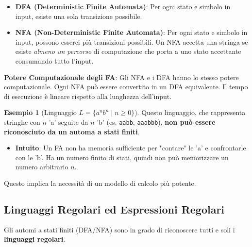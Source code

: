 \documentclass[a4paper]{article}
\theoremstyle{definition} %
\newtheorem{example}{Esempio}
\begin{document}
\begin{itemize}
    \item \textbf{DFA (Deterministic Finite Automata)}: Per ogni stato e simbolo in input, esiste una sola transizione possibile.
    \item \textbf{NFA (Non-Deterministic Finite Automata)}: Per ogni stato e simbolo in input, possono esserci più transizioni possibili. Un NFA accetta una stringa se esiste \emph{almeno un percorso} di computazione che porta a uno stato accettante consumando tutto l'input.
\end{itemize}

\textbf{Potere Computazionale degli FA}:
Gli NFA e i DFA hanno lo stesso potere computazionale. Ogni NFA può essere convertito in un DFA equivalente. Il tempo di esecuzione è lineare rispetto alla lunghezza dell'input.

\begin{example}[Linguaggio $L = \{a^n b^n \mid n \ge 0\}$]
    Questo linguaggio, che rappresenta stringhe con $n$ 'a' seguite da $n$ 'b' (es. \texttt{aabb}, \texttt{aaabbb}), \textbf{non può essere riconosciuto da un automa a stati finiti}.
    \begin{itemize}
        \item \textbf{Intuito}: Un FA non ha memoria sufficiente per "contare" le 'a' e confrontarle con le 'b'. Ha un numero finito di stati, quindi non può memorizzare un numero arbitrario $n$.
    \end{itemize}
    Questo implica la necessità di un modello di calcolo più potente.
\end{example}

\subsection{Linguaggi Regolari ed Espressioni Regolari}
Gli automi a stati finiti (DFA/NFA) sono in grado di riconoscere tutti e soli i \textbf{linguaggi regolari}.
\end{document}
